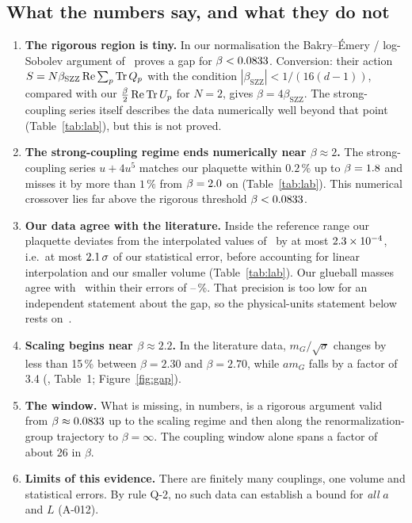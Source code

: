 \documentclass[11pt,a4paper]{article}
\newcommand{\idref}[1]{\textsf{#1}}
\begin{document}
\subsection{What the numbers say, and what they do not}
\begin{enumerate}
\item \textbf{The rigorous region is tiny.} In our normalisation the Bakry--Émery / log-Sobolev argument of~\cite{SZZ23} proves a gap for $\beta<0.0833$. Conversion: their action $S=N\beta_{\mathrm{SZZ}}\operatorname{Re}\sum_p\operatorname{Tr} Q_p$ with the condition $|\beta_{\mathrm{SZZ}}|<1/(16(d-1))$, compared with our $\tfrac{\beta}{2}\operatorname{Re}\operatorname{Tr} U_p$ for $N=2$, gives $\beta=4\beta_{\mathrm{SZZ}}$. The strong-coupling series itself describes the data numerically well beyond that point (Table~\ref{tab:lab}), but this is not proved.
\item \textbf{The strong-coupling regime ends numerically near $\beta\approx2$.} The strong-coupling series $u+4u^5$ matches our plaquette within $0.2\,\%$ up to $\beta=1.8$ and misses it by more than $1\,\%$ from $\beta=2.0$ on (Table~\ref{tab:lab}). This numerical crossover lies far above the rigorous threshold $\beta<0.0833$.
\item \textbf{Our data agree with the literature.} Inside the reference range our plaquette deviates from the interpolated values of~\cite{AT21} by at most $2.3\times10^{-4}$, i.e.\ at most $2.1\,\sigma$ of our statistical error, before accounting for linear interpolation and our smaller volume (Table~\ref{tab:lab}). Our glueball masses agree with~\cite{AT21} within their errors of \GlueRelErrMin--\GlueRelErrMax\,\%. That precision is too low for an independent statement about the gap, so the physical-units statement below rests on~\cite{AT21}.
\item \textbf{Scaling begins near $\beta\approx2.2$.} In the literature data, $m_G/\sqrt\sigma$ changes by less than 15\,\% between $\beta=2.30$ and $\beta=2.70$, while $am_G$ falls by a factor of 3.4 (\cite{AT21}, Table~1; Figure~\ref{fig:gap}).
\item \textbf{The window.} What is missing, in numbers, is a rigorous argument valid from $\beta\approx0.0833$ up to the scaling regime and then along the renormalization-group trajectory to $\beta=\infty$. The coupling window alone spans a factor of about 26 in $\beta$.
\item \textbf{Limits of this evidence.} There are finitely many couplings, one volume and statistical errors. By rule \idref{Q-2}, no such data can establish a bound for \emph{all} $a$ and $L$ (\idref{A-012}).
\end{enumerate}
\end{document}
